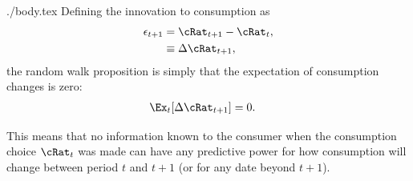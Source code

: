 \documentclass{handout}
\begin{document}
\begin{verbatimwrite}{./body.tex}
Defining the innovation to consumption as
\begin{equation}\begin{gathered}\begin{aligned}
  \epsilon_{t+1} & =  \cRat_{t+1}-\cRat_{t},
\\ & \equiv  \Delta \cRat_{t+1}
,
\end{aligned}\end{gathered}\end{equation}
the random walk proposition is simply that 
the expectation of consumption changes is zero:
\begin{equation}\begin{gathered}\begin{aligned}
  \Ex_{t}[\Delta \cRat_{t+1}] & =  0.
\end{aligned}\end{gathered}\end{equation}

This means that no information known to the consumer when
the consumption choice $\cRat_{t}$ was made can have any predictive
power for how consumption will change between period $t$ and 
$t+1$ (or for any date beyond $t+1$).

\end{verbatimwrite}



\end{document}
